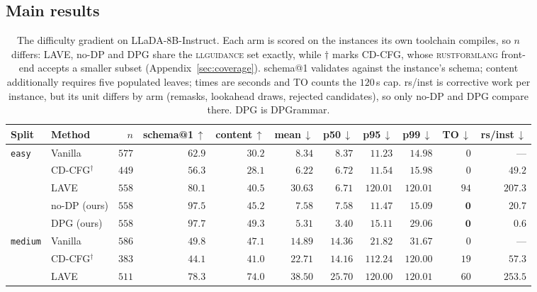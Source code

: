 \documentclass{article}
\begin{document}
\subsection{Main results}
\label{sec:results}

\begin{table}[t]
\centering
\small
\setlength{\tabcolsep}{4pt}
\caption{The difficulty gradient on LLaDA-8B-Instruct. Each arm is scored on
the instances its own toolchain compiles, so $n$ differs: LAVE, no-DP and DPG
share the \textsc{llguidance} set exactly, while $\dagger$ marks CD-CFG, whose
\textsc{rustformlang} front-end accepts a smaller subset (Appendix~\ref{sec:coverage}). 
schema@1 validates against the instance's schema;
content additionally requires five populated leaves; times are seconds and TO
counts the $120$\,s cap. rs/inst is corrective work per instance, but its unit
differs by arm (remasks, lookahead draws, rejected candidates), so only no-DP
and DPG compare there. DPG is DPGrammar.}
\label{tab:difficulty}
\begin{tabular}{llrrrrrrrrr}
\toprule
Split & Method & $n$ & schema@1\,$\uparrow$ & content\,$\uparrow$ & mean\,$\downarrow$ & p50\,$\downarrow$ & p95\,$\downarrow$ & p99\,$\downarrow$ & TO\,$\downarrow$ & rs/inst\,$\downarrow$ \\
\midrule
\multirow{5}{*}{\texttt{easy}}
 & Vanilla           & $577$ & $62.9$ & $30.2$ & $8.34$  & $8.37$  & $11.23$  & $14.98$  & $0$ & --- \\
 & CD-CFG$^\dagger$  & $449$ & $56.3$ & $28.1$ & $6.22$  & $6.72$  & $11.54$  & $15.98$  & $0$ & $49.2$ \\
 & LAVE              & $558$ & $80.1$ & $40.5$ & $30.63$ & $6.71$  & $120.01$ & $120.01$ & $94$ & $207.3$ \\
 & no-DP (ours)      & $558$ & $97.5$ & $45.2$ & $7.58$  & $7.58$  & $\mathbf{11.47}$ & $\mathbf{15.09}$ & $\mathbf{0}$ & $20.7$ \\
 & DPG (ours)        & $558$ & $\mathbf{97.7}$ & $\mathbf{49.3}$ & $\mathbf{5.31}$ & $\mathbf{3.40}$ & $15.11$ & $29.06$ & $\mathbf{0}$ & $\mathbf{0.6}$ \\
\midrule
\multirow{5}{*}{\texttt{medium}}
 & Vanilla           & $586$ & $49.8$ & $47.1$ & $14.89$ & $14.36$ & $21.82$  & $31.67$  & $0$ & --- \\
 & CD-CFG$^\dagger$  & $383$ & $44.1$ & $41.0$ & $22.71$ & $14.16$ & $112.24$ & $120.00$ & $19$ & $57.3$ \\
 & LAVE              & $511$ & $78.3$ & $74.0$ & $38.50$ & $25.70$ & $120.00$ & $120.01$ & $60$ & $253.5$ \\

\end{tabular}
\end{table}
\end{document}
